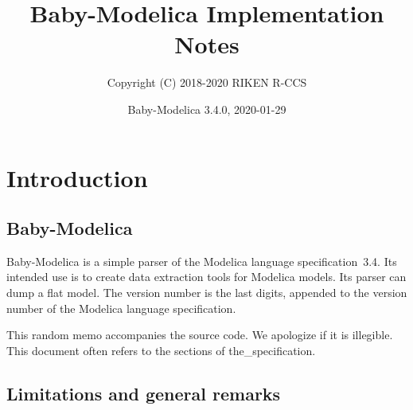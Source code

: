 \documentclass[10pt,b5paper]{article}
\title{\bf{}Baby-Modelica Implementation Notes}
\author{Copyright (C) 2018-2020 RIKEN R-CCS}
\date{Baby-Modelica 3.4.0, 2020-01-29}
\begin{document}
\maketitle

\tableofcontents



\section{Introduction}


\subsection{Baby-Modelica}

Baby-Modelica is a simple parser of the Modelica language
specification~3.4.  Its intended use is to create data extraction
tools for Modelica models.  Its parser can dump a flat model.  The
version number is the last digits, appended to the version number of
the Modelica language specification.

This random memo accompanies the source code.  We apologize if it is
illegible.  This document often refers to the sections of
the_specification.


\subsection{Limitations and general remarks}
\end{document}
